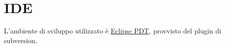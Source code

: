 \section{IDE}
L'ambiente di sviluppo utilizzato è  \href{http://www.eclipse.org/pdt/}{Eclipse PDT}, provvisto del plugin di subversion.
